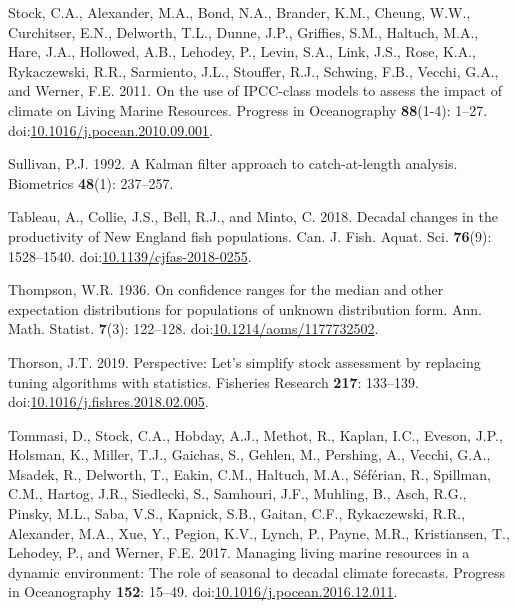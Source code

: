 \documentclass[]{article}
\begin{document}
\leavevmode\hypertarget{ref-stock2011Use}{}%
Stock, C.A., Alexander, M.A., Bond, N.A., Brander, K.M., Cheung, W.W.,
Curchitser, E.N., Delworth, T.L., Dunne, J.P., Griffies, S.M., Haltuch,
M.A., Hare, J.A., Hollowed, A.B., Lehodey, P., Levin, S.A., Link, J.S.,
Rose, K.A., Rykaczewski, R.R., Sarmiento, J.L., Stouffer, R.J., Schwing,
F.B., Vecchi, G.A., and Werner, F.E. 2011. On the use of IPCC-class
models to assess the impact of climate on Living Marine Resources.
Progress in Oceanography \textbf{88}(1-4): 1--27.
doi:\href{https://doi.org/10.1016/j.pocean.2010.09.001}{10.1016/j.pocean.2010.09.001}.

\leavevmode\hypertarget{ref-sullivan1992Kalman}{}%
Sullivan, P.J. 1992. A Kalman filter approach to catch-at-length
analysis. Biometrics \textbf{48}(1): 237--257.

\leavevmode\hypertarget{ref-tableau2018Decadal}{}%
Tableau, A., Collie, J.S., Bell, R.J., and Minto, C. 2018. Decadal
changes in the productivity of New England fish populations. Can. J.
Fish. Aquat. Sci. \textbf{76}(9): 1528--1540.
doi:\href{https://doi.org/10.1139/cjfas-2018-0255}{10.1139/cjfas-2018-0255}.

\leavevmode\hypertarget{ref-thompson1936Confidence}{}%
Thompson, W.R. 1936. On confidence ranges for the median and other
expectation distributions for populations of unknown distribution form.
Ann. Math. Statist. \textbf{7}(3): 122--128.
doi:\href{https://doi.org/10.1214/aoms/1177732502}{10.1214/aoms/1177732502}.

\leavevmode\hypertarget{ref-thorson2019Perspective}{}%
Thorson, J.T. 2019. Perspective: Let's simplify stock assessment by
replacing tuning algorithms with statistics. Fisheries Research
\textbf{217}: 133--139.
doi:\href{https://doi.org/10.1016/j.fishres.2018.02.005}{10.1016/j.fishres.2018.02.005}.

\leavevmode\hypertarget{ref-tommasi2017Managing}{}%
Tommasi, D., Stock, C.A., Hobday, A.J., Methot, R., Kaplan, I.C.,
Eveson, J.P., Holsman, K., Miller, T.J., Gaichas, S., Gehlen, M.,
Pershing, A., Vecchi, G.A., Msadek, R., Delworth, T., Eakin, C.M.,
Haltuch, M.A., Séférian, R., Spillman, C.M., Hartog, J.R., Siedlecki,
S., Samhouri, J.F., Muhling, B., Asch, R.G., Pinsky, M.L., Saba, V.S.,
Kapnick, S.B., Gaitan, C.F., Rykaczewski, R.R., Alexander, M.A., Xue,
Y., Pegion, K.V., Lynch, P., Payne, M.R., Kristiansen, T., Lehodey, P.,
and Werner, F.E. 2017. Managing living marine resources in a dynamic
environment: The role of seasonal to decadal climate forecasts. Progress
in Oceanography \textbf{152}: 15--49.
doi:\href{https://doi.org/10.1016/j.pocean.2016.12.011}{10.1016/j.pocean.2016.12.011}.
\end{document}
